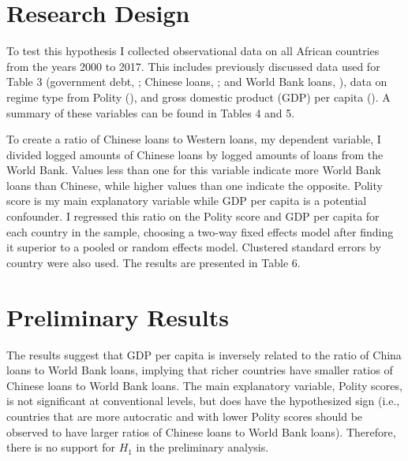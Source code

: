 \documentclass[12pt]{article}
\begin{document}
\section*{Research Design}
To test this hypothesis I collected observational data on all African countries from the years 2000 to 2017. This includes previously discussed data used for Table 3 (government debt, \cite{theworldbankgroup2022}; Chinese loans, \cite{custer2021}; and World Bank loans, \cite{theworldbankgroup2022a}), data on regime type from Polity (\cite{marshall2018}), and gross domestic product (GDP) per capita (\cite{unitednationsstatisticsdivision2019}). A summary of these variables can be found in Tables 4 and 5.

To create a ratio of Chinese loans to Western loans, my dependent variable, I divided logged amounts of Chinese loans by logged amounts of loans from the World Bank. Values less than one for this variable indicate more World Bank loans than Chinese, while higher values than one indicate the opposite. Polity score is my main explanatory variable while GDP per capita is a potential confounder. I regressed this ratio on the Polity score and GDP per capita for each country in the sample, choosing a two-way fixed effects model after finding it superior to a pooled or random effects model. Clustered standard errors by country were also used. The results are presented in Table 6. 

\section*{Preliminary Results}
The results suggest that GDP per capita is inversely related to the ratio of China loans to World Bank loans, implying that richer countries have smaller ratios of Chinese loans to World Bank loans. The main explanatory variable, Polity scores, is not significant at conventional levels, but does have the hypothesized sign (i.e., countries that are more autocratic and with lower Polity scores should be observed to have larger ratios of Chinese loans to World Bank loans). Therefore, there is no support for $H_1$ in the preliminary analysis. 
\end{document}
